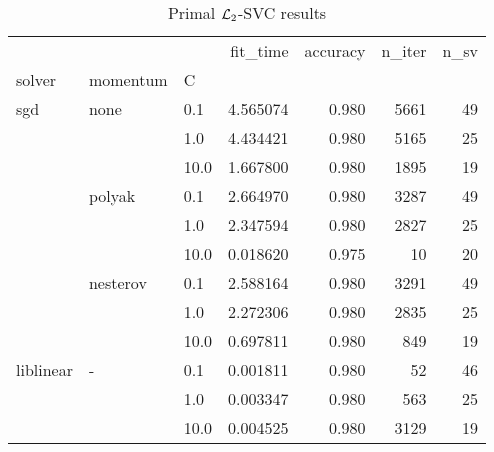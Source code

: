 \begin{table}[H]
\centering
\caption{Primal $\protect \mathcal{L}_2$-SVC results}
\label{primal_l2_svc_cv_results}
\begin{tabular}{lllrrrr}
\toprule
          &   &      &  fit\_time &  accuracy &  n\_iter &  n\_sv \\
solver & momentum & C &           &           &         &       \\
\midrule
sgd & none & 0.1  &  4.565074 &     0.980 &    5661 &    49 \\
          &   & 1.0  &  4.434421 &     0.980 &    5165 &    25 \\
          &   & 10.0 &  1.667800 &     0.980 &    1895 &    19 \\
          & polyak & 0.1  &  2.664970 &     0.980 &    3287 &    49 \\
          &   & 1.0  &  2.347594 &     0.980 &    2827 &    25 \\
          &   & 10.0 &  0.018620 &     0.975 &      10 &    20 \\
          & nesterov & 0.1  &  2.588164 &     0.980 &    3291 &    49 \\
          &   & 1.0  &  2.272306 &     0.980 &    2835 &    25 \\
          &   & 10.0 &  0.697811 &     0.980 &     849 &    19 \\
liblinear & - & 0.1  &  0.001811 &     0.980 &      52 &    46 \\
          &   & 1.0  &  0.003347 &     0.980 &     563 &    25 \\
          &   & 10.0 &  0.004525 &     0.980 &    3129 &    19 \\
\bottomrule
\end{tabular}
\end{table}
